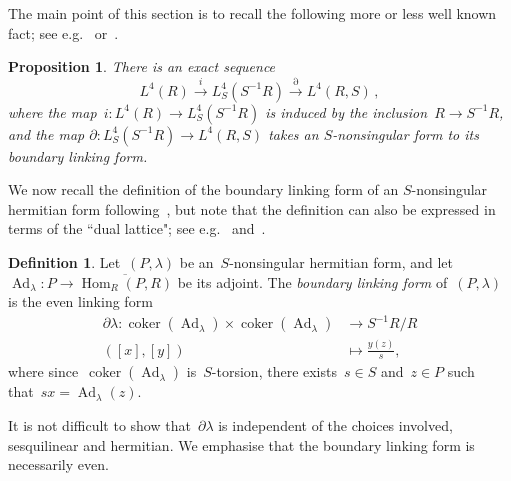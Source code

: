 \documentclass[10.9pt,a4paper]{amsart}
\newtheorem{proposition}[theorem]{Proposition}
\theoremstyle{definition}
\newtheorem{definition}[theorem]{Definition}
\theoremstyle{remark}
\newcommand{\Z}{\mathbb{Z}}
\newcommand{\Q}{\mathbb{Q}}
\newcommand{\coker}{\operatorname{coker}}
\newcommand{\Hom}{\operatorname{Hom}}
\newcommand{\Ad}{\operatorname{Ad}}
\begin{document}
The main point of this section is to recall the following more or less well known fact; see e.g.~\cite[Lemma~1]{CarlssonMilgram} or~\cite[page~172]{Ranicki}.


\begin{proposition}
\label{prop:LTheoryMap}
There is an exact sequence
$$
L^4(R) \xrightarrow{i} L^4_S(S^{-1}R) \xrightarrow{\partial} L^4(R,S)\,,
$$
where the map~$i \colon L^4(R) \to L^4_{S}(S^{-1}R)$ is induced by the inclusion~$R \to S^{-1}R$,
and the map $\partial \colon L^4_S(S^{-1}R) \to L^4(R,S)$ takes an $S$-nonsingular form to its boundary linking form.
%
\end{proposition}


We now recall the definition of the boundary linking form of an $S$-nonsingular hermitian form following~\cite[page 243]{Ranicki}, but note that the definition can also be expressed in terms of the ``dual lattice"; see e.g.~\cite[pages 244-245]{Ranicki} and~\cite[Section 4]{CarlssonMilgram}.


\begin{definition}
\label{def:BoundaryLinking}
Let~$(P,\lambda)$ be an~$S$-nonsingular hermitian form, and let~$\Ad_\lambda\colon P\to\overline{\Hom_R(P,R)}$ be its adjoint.
 The \emph{boundary linking form} of~$(P,\lambda)$ is the even linking form
\begin{align*}
 \partial \lambda \colon \coker(\Ad_\lambda) \times \coker(\Ad_\lambda) &\to S^{-1}R/R  \\
 ([x],[y]) &\mapsto  \frac{y(z)}{s},
\end{align*}
where since~$\coker(\Ad_{\lambda})$ is~$S$-torsion, there exists~$s \in S$ and~$z \in P$ such that~$sx=\Ad_\lambda(z)$.
\end{definition}

It is not difficult to show that~$\partial \lambda$ is independent of the choices involved, sesquilinear and hermitian.
We emphasise that the boundary linking form is necessarily even.
\end{document}
